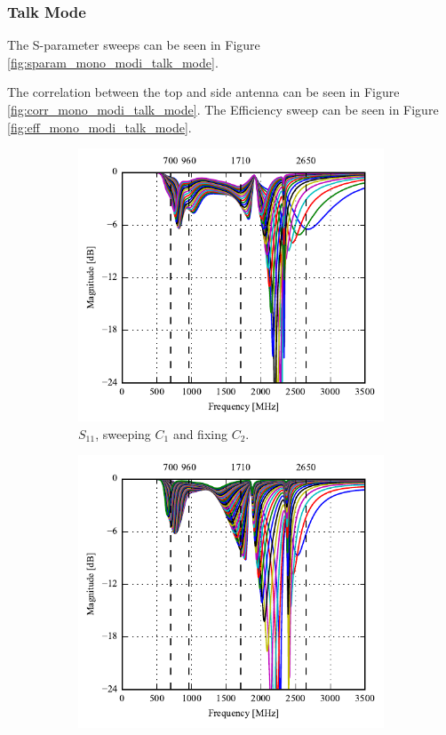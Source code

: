\FloatBarrier
\subsubsection{Talk Mode}
The S-parameter sweeps can be seen in Figure \ref{fig:sparam_mono_modi_talk_mode}.

The correlation between the top and side antenna can be seen in Figure \ref{fig:corr_mono_modi_talk_mode}.
The Efficiency sweep can be seen in Figure \ref{fig:eff_mono_modi_talk_mode}. 

\begin{figure}[htbp]
   \begin{subfigure}[b]{0.49\linewidth}
        \centering
        \includegraphics{img/tech_sol/monopole/highband/ue/talkmode/s11.pdf}
        \caption{$S_{11}$, sweeping $C_1$ and fixing $C_2$.}
    \end{subfigure}
    \hfill
    \begin{subfigure}[b]{0.49\linewidth}
        \centering
        \includegraphics{img/tech_sol/monopole/highband/ue/talkmode/s22.pdf}

\end{subfigure}
\end{figure}
